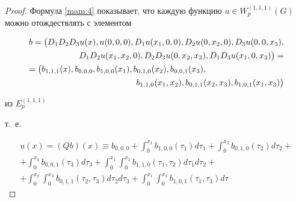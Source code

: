 \begin{proof}

Формула \eqref{mam:4} показывает, что каждую функцию  \mbox{$u\in W_{p}^{\left(1,1,1\right)} (G)$} можно отождествлять с элементом

\begin{multline*}

b=\bigl(

D_1 D_2 D_3 u(x),u(0, 0, 0),D_1 u(x_1 , 0, 0),D_2 u(0, x_2 , 0),D_3 u(0, 0, x_3 ),


\\


\hfill

D_1 D_2 u(x_1 , x_2 , 0),D_2 D_3 u(0, x_2 , x_3 ),D_1 D_3 u(x_1 , 0, x_3 )\bigr) =


\\


=\bigl(

b_{1, 1, 1}(x),b_{0, 0, 0},b_{1, 0, 0}(x_1 ), b_{0, 1, 0}(x_2 ), b_{0, 0, 1}(x_3 ), \hfill \\

\hfill b_{1, 1, 0}(x_1 , x_2 ), b_{0, 1, 1}(x_2 , x_3 ), b_{1, 0, 1}(x_1 , x_3 )\bigr)

\end{multline*}

из $E_{p}^{(1, 1, 1) }$ 

т.~е.

\begin{multline*}

u(x)=( Qb )(x)\equiv b_{0, 0, 0}+\int_{0}^{x_1 }b_{1, 0, 0}(\tau_1 )d\tau _1 +\int_{0}^{x_2 }b_{0, 1, 0}(\tau_2 )d\tau_2 +

\\

+\int_{0}^{x_3 }b_{0, 0, 1}(\tau _3 )d\tau_3 +\int_{0}^{x_1 }\int_{0}^{x_2 }b_{1, 1, 0}(\tau_1 ,\tau_2 )d\tau_1 d\tau_2 + 

\\

+\int_{0}^{x_2 }\int_{0}^{x_3 }b_{0, 1, 1}(\tau _2 ,\tau

_3 )d\tau _2 d\tau _3 

+\int_{0}^{x_1 }\int_{0}^{x_3 }b_{1, 0, 1}(\tau _1 ,\tau _3 )d\tau


\end{multline*}
\end{proof}

